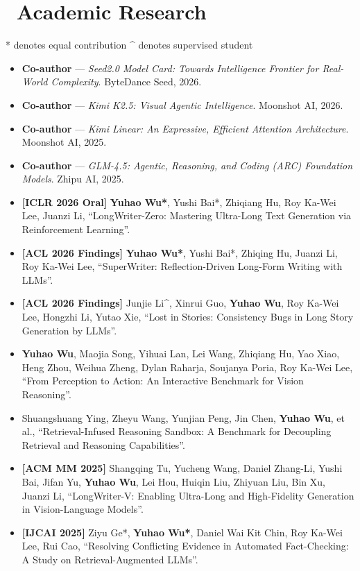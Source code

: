 \documentclass{resume}
\begin{document}
\section{\faCogs\ Academic Research}
\small{* denotes equal contribution \quad \^{} denotes supervised student}
\begin{itemize}[parsep=0.5ex]
    \item \textbf{Co-author} --- \textit{Seed2.0 Model Card: Towards Intelligence Frontier for Real-World Complexity}. ByteDance Seed, 2026.
    \item \textbf{Co-author} --- \textit{Kimi K2.5: Visual Agentic Intelligence}. Moonshot AI, 2026.
    \item \textbf{Co-author} --- \textit{Kimi Linear: An Expressive, Efficient Attention Architecture}. Moonshot AI, 2025.
    \item \textbf{Co-author} --- \textit{GLM-4.5: Agentic, Reasoning, and Coding (ARC) Foundation Models}. Zhipu AI, 2025.
    \item[\textbf{--}] \textbf{[ICLR 2026 Oral]} \textbf{Yuhao Wu*}, Yushi Bai*, Zhiqiang Hu, Roy Ka-Wei Lee, Juanzi Li, ``LongWriter-Zero: Mastering Ultra-Long Text Generation via Reinforcement Learning''.
    \item[\textbf{--}] \textbf{[ACL 2026 Findings]} \textbf{Yuhao Wu*}, Yushi Bai*, Zhiqing Hu, Juanzi Li, Roy Ka-Wei Lee, ``SuperWriter: Reflection-Driven Long-Form Writing with LLMs''.
    \item[\textbf{--}] \textbf{[ACL 2026 Findings]} Junjie Li\^{}, Xinrui Guo, \textbf{Yuhao Wu}, Roy Ka-Wei Lee, Hongzhi Li, Yutao Xie, ``Lost in Stories: Consistency Bugs in Long Story Generation by LLMs''.
    \item[\textbf{--}] [arXiv 2026] \textbf{Yuhao Wu}, Maojia Song, Yihuai Lan, Lei Wang, Zhiqiang Hu, Yao Xiao, Heng Zhou, Weihua Zheng, Dylan Raharja, Soujanya Poria, Roy Ka-Wei Lee, ``From Perception to Action: An Interactive Benchmark for Vision Reasoning''.
    \item[\textbf{--}] [arXiv 2026] Shuangshuang Ying, Zheyu Wang, Yunjian Peng, Jin Chen, \textbf{Yuhao Wu}, et al., ``Retrieval-Infused Reasoning Sandbox: A Benchmark for Decoupling Retrieval and Reasoning Capabilities''.
    \item[\textbf{--}] \textbf{[ACM MM 2025]} Shangqing Tu, Yucheng Wang, Daniel Zhang-Li, Yushi Bai, Jifan Yu, \textbf{Yuhao Wu}, Lei Hou, Huiqin Liu, Zhiyuan Liu, Bin Xu, Juanzi Li, ``LongWriter-V: Enabling Ultra-Long and High-Fidelity Generation in Vision-Language Models''.
    \item[\textbf{--}] \textbf{[IJCAI 2025]} Ziyu Ge*, \textbf{Yuhao Wu*}, Daniel Wai Kit Chin, Roy Ka-Wei Lee, Rui Cao, ``Resolving Conflicting Evidence in Automated Fact-Checking: A Study on Retrieval-Augmented LLMs''.

\end{itemize}
\end{document}
